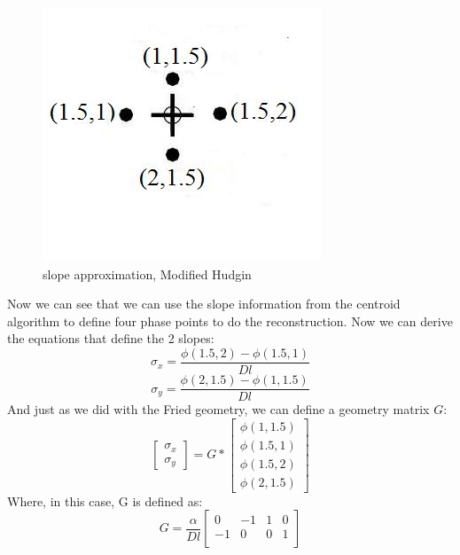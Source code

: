 \documentclass{article}
\begin{document}
\newpage
\begin{figure}[h!]
  \centering
  \includegraphics[scale=0.6]{figures/mod_hudgin}
  \caption{slope approximation, Modified Hudgin}
\end{figure}
\noindent Now we can see that we can use the slope information from the centroid algorithm to define four phase points to do the reconstruction. Now we can derive the equations that define the 2 slopes:
$$ \sigma_x = \frac{\phi(1.5,2)-\phi(1.5,1)}{Dl}$$
$$ \sigma_y = \frac{\phi(2,1.5)-\phi(1,1.5)}{Dl}$$
And just as we did with the Fried geometry, we can define a geometry matrix $G$:
$$ 
\begin{bmatrix}
\sigma_x \\
\sigma_y
\end{bmatrix} 
=
G
*
\begin{bmatrix}
\phi(1,1.5) \\
\phi(1.5,1) \\
\phi(1.5,2) \\
\phi(2,1.5) 
\end{bmatrix}
$$
Where, in this case, G is defined as:
$$
G
=
\frac{\alpha}{Dl}
\begin{bmatrix}
0 & -1 & 1 & 0 \\
-1 & 0 & 0 & 1 \\
\end{bmatrix}
$$
\end{document}
